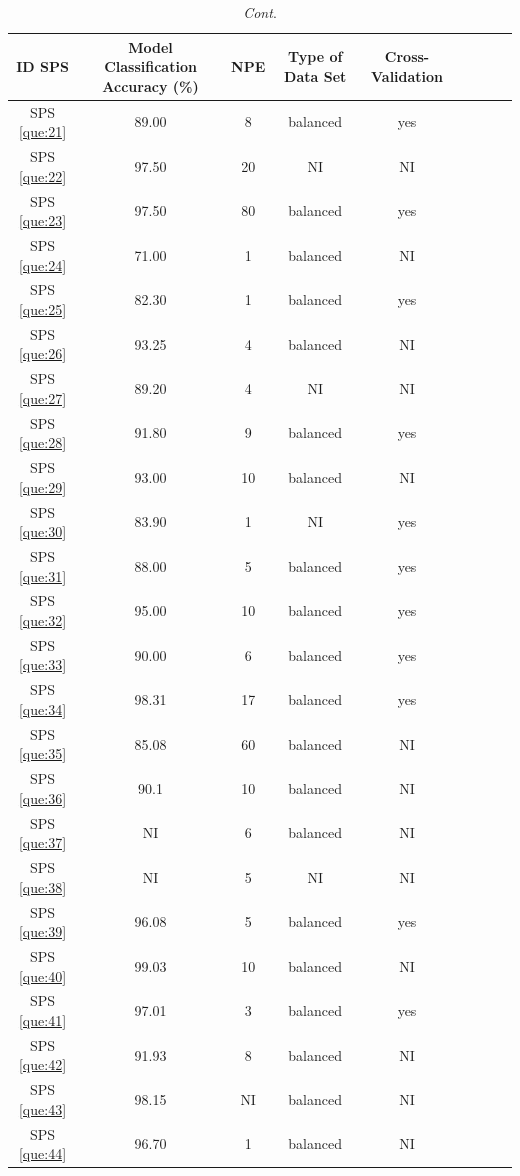 \documentclass[sensors,review,accept,moreauthors,pdftex]{Definitions/mdpi}
\begin{document}
\begin{table}[H]\ContinuedFloat
\centering
\caption{\textit{Cont}.}
\begin{tabular}{ccccccccc}
	\toprule
	
	
	\textbf{ID SPS}&\textbf{Model Classification Accuracy (\%)}&\textbf{NPE}&\textbf{Type of Data Set}&\textbf{Cross-Validation}\\
	
	\midrule
	
	
	
	SPS \ref{que:21}	&	89.00	&	8	&	balanced	&	yes	\\	
	SPS \ref{que:22}	&	97.50	&	20	&	NI	&	NI	\\	
	SPS \ref{que:23}	&	97.50	&	80	&	balanced	&	yes	\\	
	SPS \ref{que:24}	&	71.00	&	1	&	balanced	&	NI	\\	
	SPS \ref{que:25}	&	82.30	&	1	&	balanced	&	yes	\\	
	SPS \ref{que:26}	&	93.25	&	4	&	balanced	&	NI	\\	
	SPS \ref{que:27}	&	89.20	&	4	&	NI	&	NI	\\	
	SPS \ref{que:28}	&	91.80	&	9	&	balanced	&	yes	\\	
	SPS \ref{que:29}	&	93.00	&	10	&	balanced	&	NI	\\	
	SPS \ref{que:30}	&	83.90	&	1	&	NI	&	yes	\\	
	SPS \ref{que:31}	&	88.00	&	5	&	balanced	&	yes	\\	
	SPS \ref{que:32}	&	95.00	&	10	&	balanced	&	yes	\\	
	SPS \ref{que:33}	&	90.00	&	6	&	balanced	&	yes	\\	
	SPS \ref{que:34}	&	98.31	&	17	&	balanced	&	yes	\\	
	SPS \ref{que:35}	&	85.08	&	60	&	balanced	&	NI	\\	
	SPS \ref{que:36}	&	90.1	&	10	&	balanced	&	NI	\\	
	SPS \ref{que:37}	&	NI	&	6	&	balanced	&	NI	\\	
	SPS \ref{que:38}	&	NI	&	5	&	NI	&	NI	\\	
	SPS \ref{que:39}	&	96.08	&	5	&	balanced	&	yes	\\	
	SPS \ref{que:40}	&	99.03	&	10	&	balanced	&	NI	\\	
	SPS \ref{que:41}	&	97.01	&	3	&	balanced	&	yes	\\	
	SPS \ref{que:42}	&	91.93	&	8	&	balanced	&	NI	\\	
	SPS \ref{que:43}	&	98.15	&	NI	&	balanced	&	NI	\\	
	SPS \ref{que:44}	&	96.70	&	1	&	balanced	&	NI	\\	

\end{tabular}
\end{table}
\end{document}
